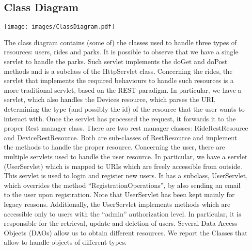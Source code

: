 \subsection{Class Diagram}

\texttt{[image: images/ClassDiagram.pdf]}

The class diagram contains (some of) the classes used to handle three types of resources: users, rides and parks. It is possible to observe that we have a single servlet to handle the parks. Such servlet implements the doGet and doPost methods and is a subclass of the HttpServlet class. Concerning the rides, the servlet that implements the required behaviours to handle such resources is a more traditional servlet, based on the REST paradigm. In particular, we have a servlet, which also handles the Devices resource, which parses the URI, determining the type (and possibly the id) of the resource that the user wants to interact with. Once the servlet has processed the request, it forwards it to the proper Rest manager class. There are two rest manager classes: RideRestResource and DeviceRestResource. Both are sub-classes of RestResource and implement the methods to handle the proper resource. Concerning the user, there are multiple servlets used to handle the user resource. In particular, we have a servlet (UserServlet) which is mapped to URIs which are freely accessible from outside. This servlet is used to login and register new users. It has a subclass, UserServlet, which overrides the method “RegistrationOperations”, by also sending an email to the user upon registration. Note that UserServlet has been kept mainly for legacy reasons. Additionally, the UserServlet implements methods which are accessible only to users with the “admin” authorization level. In particular, it is responsible for the retrieval, update and deletion of users. Several Data Access Objects (DAOs) allow us to obtain different resources. We report the Classes that allow to handle objects of different types.